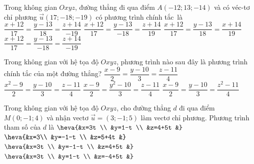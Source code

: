 \begin{ex}%
	Trong không gian $ Oxyz$, đường thẳng đi qua điểm $ A\left(-12;13;-14\right)$ và có véc-tơ chỉ phương $\overrightarrow u\left(17;-18;-19\right)$ có phương trình  chính tắc~là
	\choice 
		 {$\dfrac{x+12}{17}=\dfrac{y-13}{18}=\dfrac{z+14}{-19}$}
		{$\dfrac{x+12}{17}=\dfrac{y-13}{-18}=\dfrac{z+14}{19}$} 
		 {$\dfrac{x+12}{17}=\dfrac{y-13}{18}=\dfrac{x+14}{19}$}
		{\True  $\dfrac{x+12}{17}=\dfrac{y-13}{-18}=\dfrac{z+14}{-19}$}
\end{ex}

\begin{ex}%
	Trong không  gian với hệ tọa độ $Oxyz$, phương trình nào sau đây là phương trình chính tắc của một đường thẳng?
	 \choice
		{\True $\dfrac{x-9}{2}=\dfrac{y-10}{3}=\dfrac{z-11}{4}$} 
		{$\dfrac{x^2-9}{2}=\dfrac{y-10}{3}=\dfrac{z-11}{4}$} 
		 {$\dfrac{x-9}{2}=\dfrac{y^2-10}{3}=\dfrac{z-11}{4}$}
		 {$\dfrac{x-9}{2}=\dfrac{y-10}{3}=\dfrac{z^2-11}{4}$}
\end{ex}

\begin{ex}%
	Trong không gian với hệ tọa độ $Oxyz$, cho đường thẳng $d$ đi qua điểm $M(0;-1; 4)$ và nhận vectơ $\overrightarrow{u}=(3;-1; 5)$ làm vectơ chỉ phương. Phương trình tham số  của $d$ là
	 \choice
		 {$\heva{&x=3t \\
		 &y=1-t \\
		&z=4+5t 
		 &}$}
		 {$\heva{&x=3\\
		&y=-1-t  \\
		 &z=5+4t
		&}$} 
		 {\True $\heva{&x=3t \\
		 &y=-1-t \\
		 &z=4+5t
		 &}$}
		 {$\heva{&x=3t \\
		&y=1-t \\ 
		 &z=-4+5t
		&}$} 
\end{ex}

